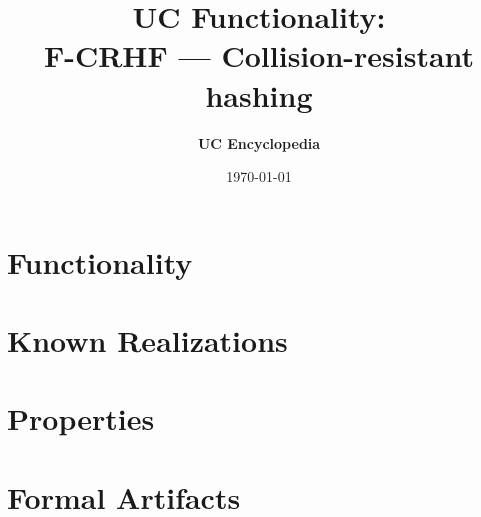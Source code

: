\documentclass[11pt,a4paper]{article}
\title{\textbf{\Large UC Functionality:}\\[0.2em] \Large F-CRHF --- Collision-resistant hashing}
\author{\textbf{UC Encyclopedia}}
\date{\today}
\newtheorem{functionality}{Functionality}
\begin{document}
\maketitle

\begin{abstract}
\end{abstract}

\section{Functionality}

%

\section{Known Realizations}


\section{Properties}


\section{Formal Artifacts}

\end{document}
